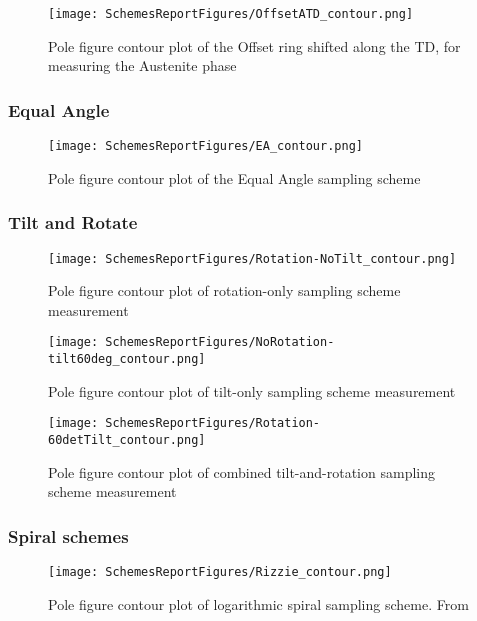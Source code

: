 \documentclass{article}
\begin{document}
\begin{figure}[ht]
    \centering
    \texttt{[image: SchemesReportFigures/OffsetATD\_contour.png]}
    \caption{Pole figure contour plot of the Offset ring shifted along the TD, for measuring the Austenite phase}
\end{figure}



\subsubsection{Equal Angle}

\begin{figure}[ht]
    \centering
    \texttt{[image: SchemesReportFigures/EA\_contour.png]}
    \caption{Pole figure contour plot of the Equal Angle sampling scheme}
\end{figure}

\subsubsection{Tilt and Rotate}

\begin{figure}[ht]
    \centering
    \texttt{[image: SchemesReportFigures/Rotation-NoTilt\_contour.png]}
    \caption{Pole figure contour plot of rotation-only sampling scheme measurement}
\end{figure}


\begin{figure}[ht]
    \centering
    \texttt{[image: SchemesReportFigures/NoRotation-tilt60deg\_contour.png]}
    \caption{Pole figure contour plot of tilt-only sampling scheme measurement}
\end{figure}


\begin{figure}[ht]
    \centering
    \texttt{[image: SchemesReportFigures/Rotation-60detTilt\_contour.png]}
    \caption{Pole figure contour plot of combined tilt-and-rotation sampling scheme measurement}
\end{figure}



\subsubsection{Spiral schemes}
\begin{figure}[ht]
    \centering
    \texttt{[image: SchemesReportFigures/Rizzie\_contour.png]}
    \caption{Pole figure contour plot of logarithmic spiral sampling scheme. From \cite{Rizzie}}
\end{figure}
\end{document}
